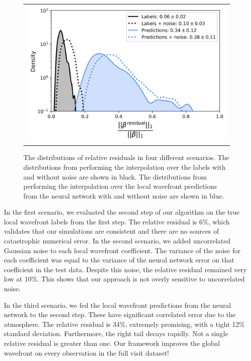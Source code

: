 \begin{figure}[!htbp]
\begin{center}
\begin{tabular}{c}
\includegraphics[width=\textwidth]{figs/interp/dist_defense2.png}
\end{tabular}
\end{center}
\caption[Relative Residuals In Different Scenarios]{The distributions of relative residuals in four different scenarios. The distributions from performing the interpolation over the labels with and without noise are shown in black. The distributions from performing the interpolation over the local wavefront predictions from the neural network with and without noise are shown in blue. \label{fig:beta-results}}
\end{figure} 

In the first scenario, we evaluated the second step of our algorithm on the true local wavefront labels from the first step. The relative residual is 6\%, which validates that our simulations are consistent and there are no sources of catastrophic numerical error. In the second scenario, we added uncorrelated Gaussian noise to each local wavefront coefficient. The variance of the noise for each coefficient was equal to the variance of the neural network error on that coefficient in the test data. Despite this noise, the relative residual remained very low at 10\%. This shows that our approach is not overly sensitive to uncorrelated noise.

In the third scenario, we fed the local wavefront predictions from the neural network to the second step. These have significant correlated error due to the atmosphere. The relative residual is 34\%, extremely promising, with a tight 12\% standard deviation. Furthermore, the right tail decays rapidly. Not a single relative residual is greater than one. Our framework improves the global wavefront on every observation in the full visit dataset!

